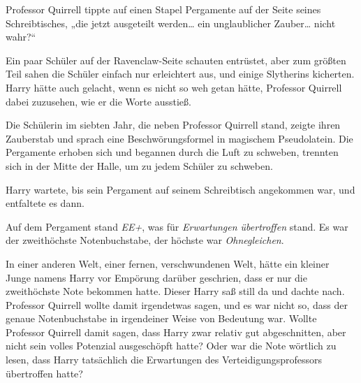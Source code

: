 Professor Quirrell tippte auf einen Stapel Pergamente auf der Seite seines Schreibtisches,
„die jetzt ausgeteilt werden… ein unglaublicher Zauber… nicht wahr?“

Ein paar Schüler auf der Ravenclaw-Seite schauten entrüstet, aber zum größten Teil sahen die Schüler einfach nur erleichtert aus, und einige Slytherins kicherten. Harry hätte auch gelacht, wenn es nicht so weh getan hätte, Professor Quirrell dabei zuzusehen, wie er die Worte ausstieß.

Die Schülerin im siebten Jahr, die neben Professor Quirrell stand, zeigte ihren Zauberstab und sprach eine Beschwörungsformel in magischem Pseudolatein.
Die Pergamente erhoben sich und begannen durch die Luft zu schweben, trennten sich in der Mitte der Halle, um zu jedem Schüler zu schweben.

Harry wartete, bis sein Pergament auf seinem Schreibtisch angekommen war, und entfaltete es dann.

Auf dem Pergament stand \emph{EE+}, was für \emph{Erwartungen übertroffen} stand. Es war der zweithöchste Notenbuchstabe, der höchste war \emph{Ohnegleichen}.

In einer anderen Welt, einer fernen, verschwundenen Welt, hätte ein kleiner Junge namens Harry vor Empörung darüber geschrien, dass er nur die zweithöchste Note bekommen hatte. Dieser Harry saß still da und dachte nach. Professor Quirrell wollte damit irgendetwas sagen, und es war nicht so, dass der genaue Notenbuchstabe in irgendeiner Weise von Bedeutung war.
Wollte Professor Quirrell damit sagen, dass Harry zwar relativ gut abgeschnitten, aber nicht sein volles Potenzial ausgeschöpft hatte? Oder war die Note wörtlich zu lesen, dass Harry tatsächlich die Erwartungen des Verteidigungsprofessors übertroffen hatte?

